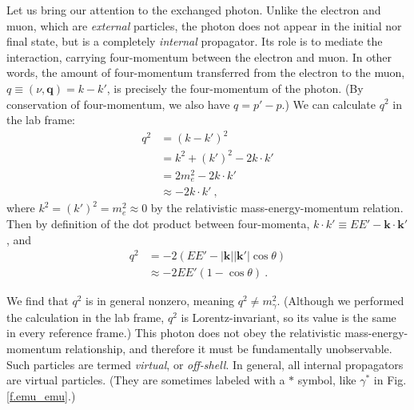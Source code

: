 Let us bring our attention to the exchanged photon. Unlike the electron and muon, which are {\it external} particles, the photon does not appear in the initial nor final state, but is a completely {\it internal} propagator. Its role is to mediate the interaction, carrying four-momentum between the electron and muon. In other words, the amount of four-momentum transferred from the electron to the muon, $q\equiv(\nu, \mathbf{q})=k-k'$, is precisely the four-momentum of the photon. (By conservation of four-momentum, we also have $q=p'-p$.) We can calculate $q^2$ in the lab frame:
\begin{equation}
\begin{aligned}
    q^2 &= (k-k')^2 \\
    &= k^2 + (k')^2 - 2k\cdot k' \\
    &= 2m_e^2 - 2 k\cdot k' \\
    &\approx -2k\cdot k' \ ,
\end{aligned}
\end{equation}
where $k^2=(k')^2=m_e^2\approx0$ by the relativistic mass-energy-momentum relation. Then by definition of the dot product between four-momenta, $k\cdot k'\equiv EE'-\mathbf{k}\cdot\mathbf{k'}$, and
\begin{equation}
\begin{aligned}
    q^2 &= -2(EE'-|\mathbf{k}||\mathbf{k'}|\cos{\theta}) \\
    &\approx -2EE'(1-\cos{\theta}) \ .
\end{aligned}
\end{equation}

We find that $q^2$ is in general nonzero,
meaning $q^2\neq m_\gamma^2$. (Although we performed the calculation in the lab frame, $q^2$ is Lorentz-invariant, so its value is the same in every reference frame.) This photon does not obey the relativistic mass-energy-momentum relationship, and therefore it must be fundamentally unobservable. Such particles are termed {\it virtual}, or {\it off-shell}. In general, all internal propagators are virtual particles. (They are sometimes labeled with a $*$ symbol, like $\gamma^*$ in Fig. \ref{f.emu_emu}.)

